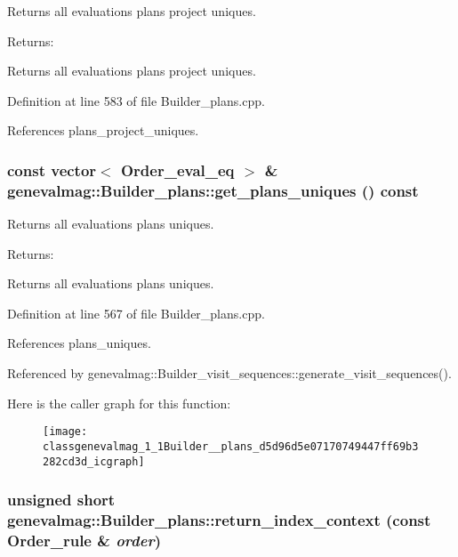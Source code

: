 Returns all evaluations plans project uniques. \begin{Desc}
\item[Returns:]\end{Desc}
Returns all evaluations plans project uniques. 

Definition at line 583 of file Builder\_\-plans.cpp.

References plans\_\-project\_\-uniques.\hypertarget{classgenevalmag_1_1Builder__plans_d5d96d5e07170749447ff69b3282cd3d}{
\subsubsection[{get\_\-plans\_\-uniques}]{\setlength{\rightskip}{0pt plus 5cm}const vector$<$ {\bf Order\_\-eval\_\-eq} $>$ \& genevalmag::Builder\_\-plans::get\_\-plans\_\-uniques () const}}
\label{classgenevalmag_1_1Builder__plans_d5d96d5e07170749447ff69b3282cd3d}


Returns all evaluations plans uniques. \begin{Desc}
\item[Returns:]\end{Desc}
Returns all evaluations plans uniques. 

Definition at line 567 of file Builder\_\-plans.cpp.

References plans\_\-uniques.

Referenced by genevalmag::Builder\_\-visit\_\-sequences::generate\_\-visit\_\-sequences().

Here is the caller graph for this function:\nopagebreak
\begin{figure}[H]
\begin{center}
\leavevmode
\texttt{[image: classgenevalmag\_1\_1Builder\_\_plans\_d5d96d5e07170749447ff69b3282cd3d\_icgraph]}
\end{center}
\end{figure}
\hypertarget{classgenevalmag_1_1Builder__plans_e44e39bd410967f7f882100b33fb3405}{
\subsubsection[{return\_\-index\_\-context}]{\setlength{\rightskip}{0pt plus 5cm}unsigned short genevalmag::Builder\_\-plans::return\_\-index\_\-context (const {\bf Order\_\-rule} \& {\em order})}}
\label{classgenevalmag_1_1Builder__plans_e44e39bd410967f7f882100b33fb3405}


